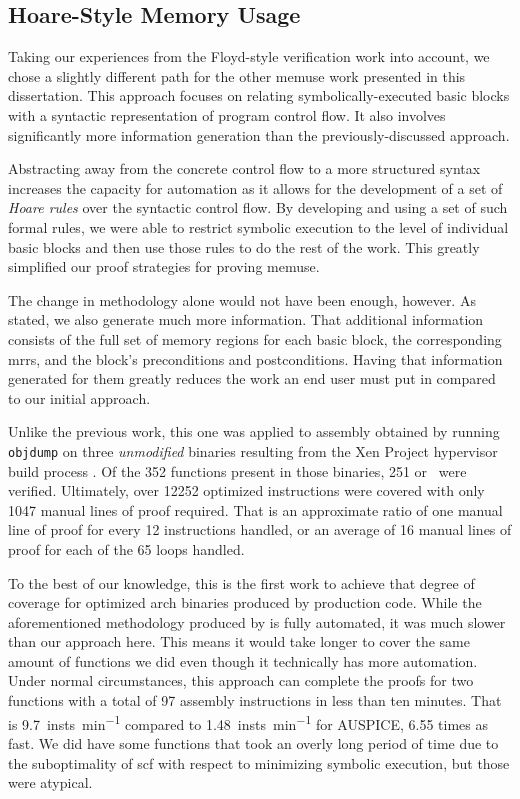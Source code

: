 \subsection{Hoare-Style Memory Usage}
Taking our experiences from the Floyd-style verification work into account, we chose a slightly different path for the other \gls{memuse} work presented in this dissertation.
This approach focuses on relating symbolically-executed basic blocks with a syntactic representation of program control flow.
It also involves significantly more information generation than the previously-discussed approach.

Abstracting away from the concrete control flow to a more structured syntax increases the capacity for automation as it allows for the development of a set of \emph{Hoare rules} \autocite{hoare1969axiomatic} over the syntactic control flow.
By developing and using a set of such formal rules, we were able to restrict symbolic execution to the level of individual basic blocks and then use those rules to do the rest of the work.
This greatly simplified our proof strategies for proving \gls{memuse}.

The change in methodology alone would not have been enough, however.
As stated, we also generate much more information.
That additional information consists of the full set of memory regions for each basic block, the corresponding \glspl{mrr}, and the block's preconditions and postconditions.
Having that information generated for them greatly reduces the work an end user must put in compared to our initial approach.

Unlike the previous work, this one was applied to assembly obtained by running \texttt{objdump} on three \emph{unmodified} binaries resulting from the Xen Project hypervisor build process \autocite{chisnall2008definitive}.
Of the \num{352} functions present in those binaries, \num{251} or \xenpercentage\ were verified.
Ultimately, over \num{12252} optimized instructions were covered with only \num{1047} manual lines of proof required.
That is an approximate ratio of one manual line of proof for every \num{12} instructions handled, or an average of \num{16} manual lines of proof for each of the \num{65} loops handled.

To the best of our knowledge, this is the first work to achieve that degree of coverage for optimized \gls{arch} binaries produced by production code.
While the aforementioned methodology produced by \textcite{tan2015auspice} is fully automated, it was much slower than our approach here.
This means it would take longer to cover the same amount of functions we did even though it technically has more automation.
Under normal circumstances, this approach can complete the proofs for two functions with a total of \num{97} assembly instructions in less than ten minutes.
That is \SI{9.7}{insts\per\minute} compared to \SI{1.48}{insts\per\minute} for AUSPICE, \num{6.55} times as fast.
We did have some functions that took an overly long period of time due to the suboptimality of \gls{scf} with respect to minimizing symbolic execution, but those were atypical.

